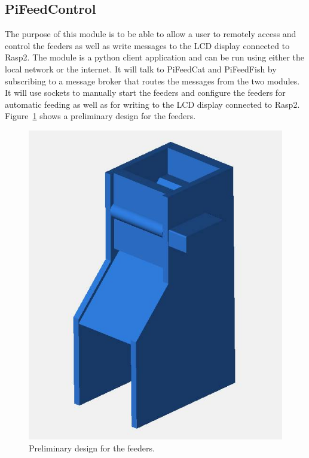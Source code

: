 \subsection{PiFeedControl}
The purpose of this module is to be able to allow a user to remotely access and
control the feeders as well as write messages to the LCD display connected to
Rasp2. The module is a python client application and can be run using either the
local network or the internet. It will talk to PiFeedCat and PiFeedFish by
subscribing to a message broker that routes the messages from the two modules.
It will use sockets to manually start the feeders and configure the feeders for
automatic feeding as well as for writing to the LCD display connected to Rasp2.
Figure~\ref{fig:prelim} shows a preliminary design for the feeders.

\begin{figure}[H]
    \centering
    \captionsetup{justification=centering, margin = 0.5cm}
    \includegraphics[scale=0.3]{images/PrelimDesign} 
    \caption{Preliminary design for the feeders.}
    \label{fig:prelim}
\end{figure}

